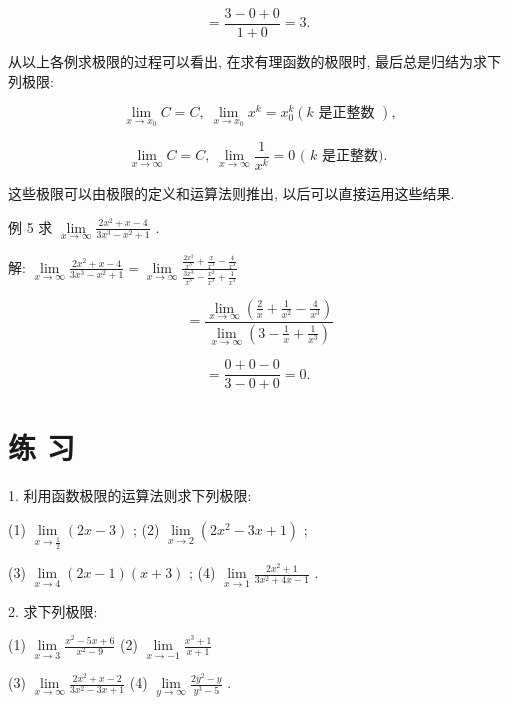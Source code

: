 \documentclass[10pt]{article}
\begin{document}
\[
= \frac{3 - 0 + 0}{1 + 0} = 3\text{. }
\]

从以上各例求极限的过程可以看出, 在求有理函数的极限时, 最后总是归结为求下列极限:

\[
\mathop{\lim }\limits_{{x \rightarrow {x}_{0}}}C = C,\;\mathop{\lim }\limits_{{x \rightarrow {x}_{0}}}{x}^{k} = {x}_{0}^{k}\left( {k\text{ 是正整数 }}\right) ,
\]

\[
\mathop{\lim }\limits_{{x \rightarrow \infty }}C = C,\;\mathop{\lim }\limits_{{x \rightarrow \infty }}\frac{1}{{x}^{k}} = 0\text{ ( }k\text{ 是正整数). }
\]

这些极限可以由极限的定义和运算法则推出, 以后可以直接运用这些结果.

例 5 求 \(\mathop{\lim }\limits_{{x \rightarrow \infty }}\frac{2{x}^{2} + x - 4}{3{x}^{3} - {x}^{2} + 1}\) .

解: \(\mathop{\lim }\limits_{{x \rightarrow \infty }}\frac{2{x}^{2} + x - 4}{3{x}^{3} - {x}^{2} + 1} = \mathop{\lim }\limits_{{x \rightarrow \infty }}\frac{\frac{2{x}^{2}}{{x}^{3}} + \frac{x}{{x}^{3}} - \frac{4}{{x}^{3}}}{\frac{3{x}^{3}}{{x}^{3}} - \frac{{x}^{2}}{{x}^{3}} + \frac{1}{{x}^{3}}}\)

\[
= \frac{\mathop{\lim }\limits_{{x \rightarrow \infty }}\left( {\frac{2}{x} + \frac{1}{{x}^{2}} - \frac{4}{{x}^{3}}}\right) }{\mathop{\lim }\limits_{{x \rightarrow \infty }}\left( {3 - \frac{1}{x} + \frac{1}{{x}^{3}}}\right) }
\]

\[
= \frac{0 + 0 - 0}{3 - 0 + 0} = 0\text{. }
\]

\section*{练 习}

1. 利用函数极限的运算法则求下列极限:

(1) \(\mathop{\lim }\limits_{{x \rightarrow \frac{1}{2}}}\left( {{2x} - 3}\right)\) ; (2) \(\mathop{\lim }\limits_{{x \rightarrow 2}}\left( {2{x}^{2} - {3x} + 1}\right)\) ;

(3) \(\mathop{\lim }\limits_{{x \rightarrow 4}}\left( {{2x} - 1}\right) \left( {x + 3}\right)\) ; (4) \(\mathop{\lim }\limits_{{x \rightarrow 1}}\frac{2{x}^{2} + 1}{3{x}^{2} + {4x} - 1}\) .

2. 求下列极限:

(1) \(\mathop{\lim }\limits_{{x \rightarrow 3}}\frac{{x}^{2} - {5x} + 6}{{x}^{2} - 9}\) (2) \(\mathop{\lim }\limits_{{x \rightarrow - 1}}\frac{{x}^{3} + 1}{x + 1}\)

(3) \(\mathop{\lim }\limits_{{x \rightarrow \infty }}\frac{2{x}^{2} + x - 2}{3{x}^{2} - {3x} + 1}\) (4) \(\mathop{\lim }\limits_{{y \rightarrow \infty }}\frac{2{y}^{2} - y}{{y}^{3} - 5}\) .
\end{document}
